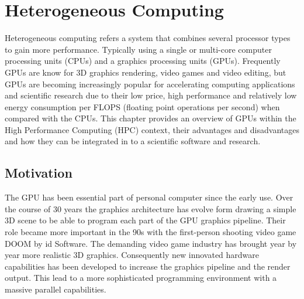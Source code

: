 

\chapter{Heterogeneous Computing} %

\label{Heterogeneous Computing} %



Heterogeneous computing refers a system that combines several processor types to gain more performance. Typically using a single or multi-core computer processing units (CPUs) and a  graphics processing units (GPUs).
Frequently GPUs are know for 3D graphics rendering, video games and video editing, but GPUs are becoming increasingly popular for accelerating computing applications and scientific research due to their low price, high performance and relatively low energy consumption per FLOPS (floating point operations per second) when compared with the CPUs. This chapter provides an overview of GPUs within the High Performance Computing (HPC) context, their advantages and disadvantages and how they can be integrated in to a scientific software and research.



\section{Motivation}

The GPU has been essential part of personal computer since the early use. Over the course of 30 years the graphics architecture has evolve form drawing a simple 3D scene to be able to program each part of the GPU graphics pipeline. Their role became more important in the 90s with the first-person shooting video game DOOM by id Software. The demanding video game industry has brought year by year more realistic 3D graphics. Consequently new innovated hardware capabilities has been developed to increase the graphics pipeline and the render output. This lead to a more sophisticated programming environment with a massive parallel capabilities.


